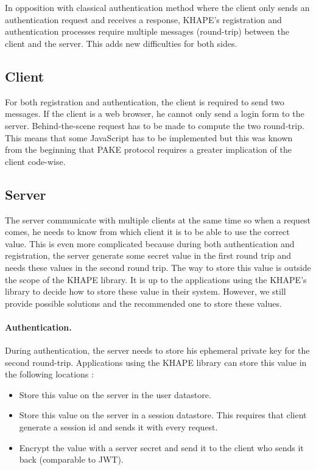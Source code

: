 ﻿\documentclass[../report.tex]{subfiles}
\begin{document}
\section{}
In opposition with classical authentication method where the client only sends an authentication request and receives a response, KHAPE's registration and authentication processes require multiple messages (round-trip) between the client and the server.
This adds new difficulties for both sides.


\subsection{Client}
For both registration and authentication, the client is required to send two messages. If the client is a web browser, he cannot only send a login form to the server. Behind-the-scene request has to be made to compute the two round-trip. This means that some JavaScript has to be implemented but this was known from the beginning that PAKE protocol requires a greater implication of the client code-wise.


\subsection{Server}
The server communicate with multiple clients at the same time so when a request comes, he needs to know from which client it is to be able to use the correct value. This is even more complicated because during both authentication and registration, the server generate some secret value in the first round trip and needs these values in the second round trip.
The way to store this value is outside the scope of the KHAPE library. It is up to the applications using the KHAPE's library to decide how to store these value in their system. However, we still provide possible solutions and the recommended one to store these values.


\paragraph{Authentication.}
During authentication, the server needs to store his ephemeral private key for the second round-trip. Applications using the KHAPE library can store this value in the following locations :

\begin{itemize}
 \item Store this value on the server in the user datastore.
 \item Store this value on the server in a session datastore. This requires that client generate a session id and sends it with every request.
 \item Encrypt the value with a server secret and send it to the client who sends it back (comparable to JWT).
\end{itemize}
\end{document}
